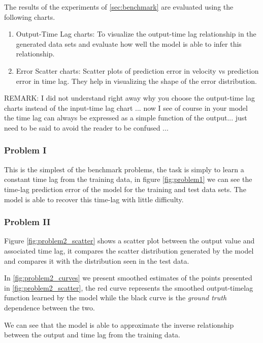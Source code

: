 \documentclass[twoside]{article}
\begin{document}
The results of the experiments of \ref{sec:benchmark} are evaluated using the following charts.

\begin{enumerate}
    \item Output-Time Lag charts: To visualize the output-time lag relationship in the generated data sets and evaluate how 
    well the model is able to infer this relationship.
    \item Error Scatter charts: Scatter plots of prediction error in velocity vs prediction error in time lag. They help in visualizing the shape of the error distribution.
\end{enumerate}

REMARK: I did not understand right away why you choose the output-time lag charts instead of the input-time lag chart ... now I see of course in your model the time lag can always be expressed as a simple function of the output... just need to be said to avoid the reader to be confused ...

\subsubsection{Problem I}

This is the simplest of the benchmark problems, the task is simply to learn a constant time lag from the training data, in figure \ref{fig:problem1} we can see the time-lag prediction error of the model for the training and test data sets. The model is able to recover this time-lag with little difficulty.


\subsubsection{Problem II}

Figure \ref{fig:problem2_scatter} shows a scatter plot between the output value and associated time lag, it compares the scatter distribution generated by the model and compares it with the distribution seen in the test data. 

In \ref{fig:problem2_curves} we present smoothed estimates of the points presented in \ref{fig:problem2_scatter}, the red curve represents the smoothed output-timelag function learned by the model while the black curve is the \emph{ground truth} dependence between the two. 

We can see that the model is able to approximate the inverse relationship between the output and time lag from the training data.
\end{document}
